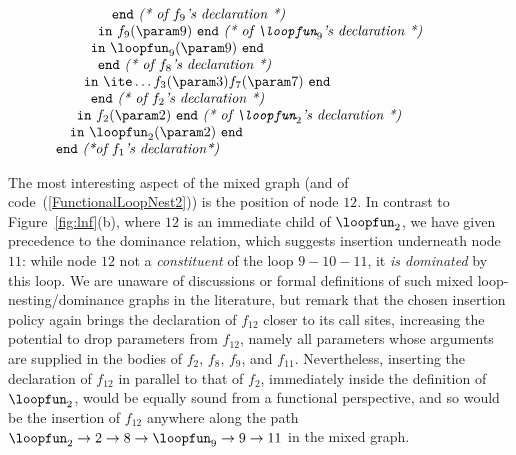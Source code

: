 \begin{equation}
\begin{array}{l}
\begin{array}{l}
\begin{array}[t]{l}
\begin{array}[t]{l}
\begin{array}[t]{l}
\begin{array}[t]{l}
\begin{array}[t]{l}
                                       \quad \mathtt{end}\ \textit{(* of $f_9$'s\ declaration *)}\\
                             \mathtt{in}\ f_9(\param 9)\ \mathtt{end}\ \textit{(* of\ $\loopfun_9$'s\ declaration *)}
                          \end{array}\\
                                 \mathtt{in}\ \loopfun_9(\param 9)\ \mathtt{end} 
                               \end{array}\\
                         \quad \mathtt{end}\ \textit{(* of $f_8$'s declaration *)}\\
                         \mathtt{in}\ \ite \ldots {f_3(\param 3)} {f_7(\param 7)}\ \mathtt{end}
                       \end{array} \\
               \quad \mathtt{end}\ \textit{(* of $f_2$'s declaration *)}\\      
               \mathtt{in}\ f_2(\param 2)\ \mathtt{end}\ \textit{(* of\ $\loopfun_2$'s\ declaration *)}
             \end{array}\\
       \mathtt{in}\ \loopfun_2(\param 2)\ \mathtt{end}
     \end{array}
  \end{array}\\ 
\mathtt{end}\ \textit{(*of\ $f_1$'s\ declaration*)}
\end{array} 
\end{equation}

The most interesting aspect of the mixed graph (and of
code~(\ref{FunctionalLoopNest2})) is the position of node $12$. In
contrast to Figure~\ref{fig:lnf}(b), where $12$ is an immediate child
of $\loopfun_2$, we have given precedence to the dominance relation,
which suggests insertion underneath node $11$: while node $12$ not a
\emph{constituent} of the loop $9-10-11$, it
\emph{is dominated} by this loop. We are unaware of discussions or
formal definitions of such mixed loop-nesting/dominance graphs in the
literature, but remark that the chosen insertion policy again brings
the declaration of $f_{12}$ closer to its call sites, increasing the
potential to drop parameters from $f_{12}$, namely all parameters
whose arguments are supplied in the bodies of $f_2$, $f_8$, $f_9$, and
$f_{11}$.  Nevertheless, inserting the declaration of $f_{12}$ in
parallel to that of $f_2$, immediately inside the definition of
$\loopfun_2$, would be equally sound from a functional perspective,
and so would be the insertion of $f_{12}$ anywhere along the path
$\loopfun_2 \to 2 \to 8 \to \loopfun_9 \to 9 \to 11$ in the mixed
graph.

